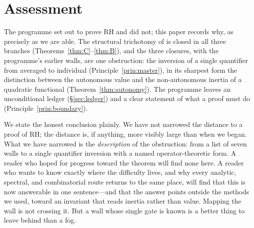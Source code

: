 \documentclass[11pt]{amsart}
\theoremstyle{definition}
\theoremstyle{remark}
\begin{document}
\section{Assessment}\label{sec:assessment}

The programme set out to prove RH and did not; this paper records why, as
precisely as we are able. The structural trichotomy of \cite{P41} is closed
in all three branches (Theorems~\ref{thm:C}--\ref{thm:B}), and the three
closures, with the programme's earlier walls, are one obstruction: the
inversion of a single quantifier from averaged to individual
(Principle~\ref{prin:master}), in its sharpest form the distinction between
the autonomous value and the non-autonomous inertia of a quadratic functional
(Theorem~\ref{thm:autonomy}). The programme leaves an unconditional ledger
(\S\ref{sec:ledger}) and a clear statement of what a proof must do
(Principle~\ref{prin:boundary}).

We state the honest conclusion plainly. We have not narrowed the distance to
a proof of RH; the distance is, if anything, more visibly large than when we
began. What we have narrowed is the \emph{description} of the obstruction:
from a list of seven walls to a single quantifier inversion with a named
operator-theoretic form. A reader who hoped for progress toward the theorem
will find none here. A reader who wants to know exactly where the difficulty
lives, and why every analytic, spectral, and combinatorial route returns to
the same place, will find that this is now answerable in one sentence---and
that the answer points outside the methods we used, toward an invariant that
reads inertia rather than value. Mapping the wall is not crossing it. But a
wall whose single gate is known is a better thing to leave behind than a
fog.
\end{document}
